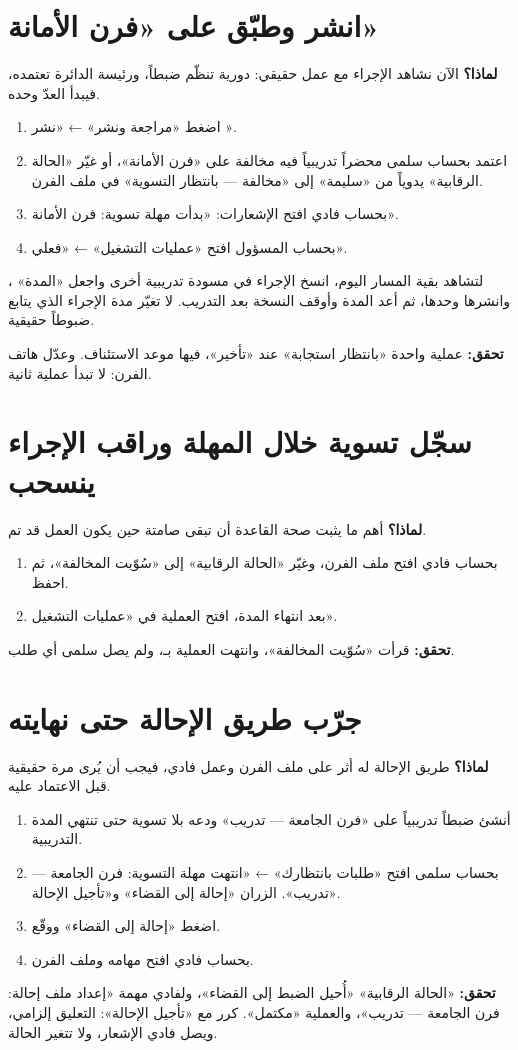 \section{انشر وطبّق على «فرن الأمانة»}
\label{sec:real-live}
\textbf{لماذا؟} الآن نشاهد الإجراء مع عمل حقيقي: دورية تنظّم ضبطاً، ورئيسة الدائرة تعتمده، فيبدأ العدّ وحده.
\begin{enumerate}
\item اضغط «مراجعة ونشر» ← «نشر ».
\item اعتمد بحساب سلمى محضراً تدريبياً فيه مخالفة على «فرن الأمانة»، أو غيّر «الحالة الرقابية» يدوياً من «سليمة» إلى «مخالفة — بانتظار التسوية» في ملف الفرن.
\item بحساب فادي افتح الإشعارات: «بدأت مهلة تسوية: فرن الأمانة».
\item بحساب المسؤول افتح «عمليات التشغيل» ← «فعلي».
\end{enumerate}
\begin{rcnote}
لتشاهد بقية المسار اليوم، انسخ الإجراء في مسودة تدريبية أخرى واجعل «المدة» ، وانشرها وحدها، ثم أعد المدة وأوقف النسخة بعد التدريب. لا تغيّر مدة الإجراء الذي يتابع ضبوطاً حقيقية.
\end{rcnote}
\textbf{تحقق:} عملية واحدة «بانتظار استجابة» عند «تأخير»، فيها موعد الاستئناف. وعدّل هاتف الفرن: لا تبدأ عملية ثانية.

\section{سجّل تسوية خلال المهلة وراقب الإجراء ينسحب}
\label{sec:real-settle}
\textbf{لماذا؟} أهم ما يثبت صحة القاعدة أن تبقى صامتة حين يكون العمل قد تم.
\begin{enumerate}
\item بحساب فادي افتح ملف الفرن، وغيّر «الحالة الرقابية» إلى «سُوّيت المخالفة»، ثم احفظ.
\item بعد انتهاء المدة، افتح العملية في «عمليات التشغيل».
\end{enumerate}
\textbf{تحقق:} قرأت  «سُوّيت المخالفة»، وانتهت العملية بـ، ولم يصل سلمى أي طلب.

\section{جرّب طريق الإحالة حتى نهايته}
\label{sec:real-refer}
\textbf{لماذا؟} طريق الإحالة له أثر على ملف الفرن وعمل فادي، فيجب أن يُرى مرة حقيقية قبل الاعتماد عليه.
\begin{enumerate}
\item أنشئ ضبطاً تدريبياً على «فرن الجامعة — تدريب» ودعه بلا تسوية حتى تنتهي المدة التدريبية.
\item بحساب سلمى افتح «طلبات بانتظارك» ← «انتهت مهلة التسوية: فرن الجامعة — تدريب». الزران «إحالة إلى القضاء» و«تأجيل الإحالة».
\item اضغط «إحالة إلى القضاء» ووقّع.
\item بحساب فادي افتح مهامه وملف الفرن.
\end{enumerate}
\textbf{تحقق:} «الحالة الرقابية» «أُحيل الضبط إلى القضاء»، ولفادي مهمة «إعداد ملف إحالة: فرن الجامعة — تدريب»، والعملية «مكتمل». كرر مع «تأجيل الإحالة»: التعليق إلزامي، ويصل فادي الإشعار، ولا تتغير الحالة.

